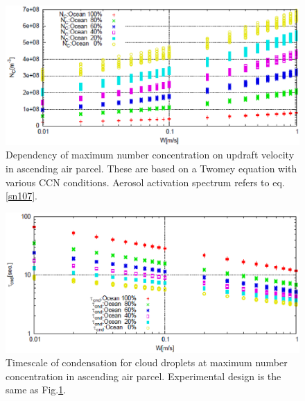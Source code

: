 \begin{figure}[htbp]
\begin{center}
\includegraphics[scale=0.5]{./figure/density_max_num.eps}
\end{center}
\caption{Dependency of maximum number concentration on updraft velocity in ascending air parcel. These are based on a Twomey equation with various CCN conditions. Aerosol activation spectrum refers to eq.\ref{sn107}.}
\label{figsn2-18}
\end{figure}

\begin{figure}[htbp]
\begin{center}
\includegraphics[scale=0.5]{./figure/cond_timescale.eps}
\end{center}
\caption{Timescale of condensation for cloud droplets at maximum number concentration in ascending air parcel. Experimental design is the same as Fig.\ref{figsn2-18}.}
\label{figsn2-19}
\end{figure}

